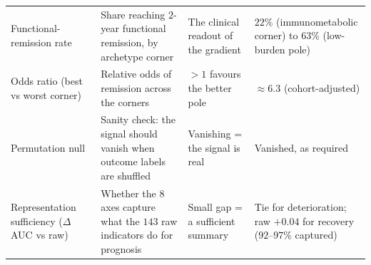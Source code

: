 {\begin{longtable}{@{}p{2.5cm}p{4.2cm}p{3.0cm}p{4.5cm}@{}}
\addlinespace
Functional-remission rate & Share reaching $2$-year functional remission, by archetype corner & The clinical readout of the gradient & $22\%$ (immunometabolic corner) to $63\%$ (low-burden pole) \\
\addlinespace
Odds ratio (best vs worst corner) & Relative odds of remission across the corners & ${>}1$ favours the better pole & ${\approx}6.3$ (cohort-adjusted) \\
\addlinespace
Permutation null & Sanity check: the signal should vanish when outcome labels are shuffled & Vanishing = the signal is real & Vanished, as required \\
\addlinespace
Representation sufficiency ($\Delta$AUC vs raw) & Whether the $8$ axes capture what the $143$ raw indicators do for prognosis & Small gap = a sufficient summary & Tie for deterioration; raw $+0.04$ for recovery ($92$--$97\%$ captured) \\
\end{longtable}
}
